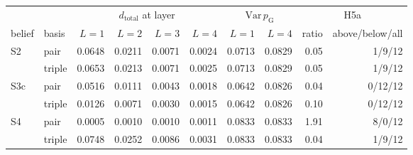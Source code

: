 \footnotesize
\begin{tabular}{llrrrrrrrr}
\toprule
& & \multicolumn{4}{c}{$d_{\mathrm{total}}$ at layer} & \multicolumn{2}{c}{$\mathrm{Var}\,p_{\mathrm{G}}$} & \multicolumn{2}{c}{H5a} \\ \cmidrule(lr){3-6}\cmidrule(lr){7-8}\cmidrule(l){9-10}
belief & basis & $L=1$ & $L=2$ & $L=3$ & $L=4$ & $L=1$ & $L=4$ & ratio & above/below/all \\
\midrule
S2 & pair & 0.0648 & 0.0211 & 0.0071 & 0.0024 & 0.0713 & 0.0829 & 0.05 & 1/9/12 \\
 & triple & 0.0653 & 0.0213 & 0.0071 & 0.0025 & 0.0713 & 0.0829 & 0.05 & 1/9/12 \\
S3c & pair & 0.0516 & 0.0111 & 0.0043 & 0.0018 & 0.0642 & 0.0826 & 0.04 & 0/12/12 \\
 & triple & 0.0126 & 0.0071 & 0.0030 & 0.0015 & 0.0642 & 0.0826 & 0.10 & 0/12/12 \\
S4 & pair & 0.0005 & 0.0010 & 0.0010 & 0.0011 & 0.0833 & 0.0833 & 1.91 & 8/0/12 \\
 & triple & 0.0748 & 0.0252 & 0.0086 & 0.0031 & 0.0833 & 0.0833 & 0.04 & 1/9/12 \\
\bottomrule
\end{tabular}
